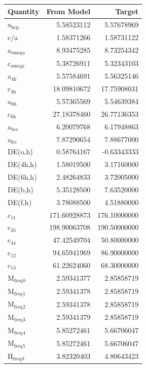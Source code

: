\documentclass[11pt]{article}
\begin{document}
\begin{center}
\begin{tabular}{lrr}
Quantity & From Model & Target\\
\hline
a\(_{\text{hcp}}\) & 5.58523112 & 5.57678969\\
c/a & 1.58371266 & 1.58731122\\
a\(_{\text{omega}}\) & 8.93475285 & 8.73254342\\
c\(_{\text{omega}}\) & 5.38726911 & 5.32343103\\
a\(_{\text{4h}}\) & 5.57584691 & 5.56325146\\
c\(_{\text{4h}}\) & 18.09810672 & 17.75908031\\
a\(_{\text{6h}}\) & 5.57365569 & 5.54639384\\
c\(_{\text{6h}}\) & 27.18378460 & 26.77136353\\
a\(_{\text{bcc}}\) & 6.20079768 & 6.17948863\\
a\(_{\text{fcc}}\) & 7.87290654 & 7.88677000\\
DE(o,h) & 0.58764167 & -0.63343333\\
DE(4h,h) & 1.58019500 & 3.17160000\\
DE(6h,h) & 2.48264833 & 3.72005000\\
DE(b,h) & 5.35128500 & 7.63520000\\
DE(f,h) & 3.78088500 & 4.51880000\\
c\(_{\text{11}}\) & 171.60928873 & 176.10000000\\
c\(_{\text{33}}\) & 198.90063708 & 190.50000000\\
c\(_{\text{44}}\) & 47.42549704 & 50.80000000\\
c\(_{\text{12}}\) & 94.65941969 & 86.90000000\\
c\(_{\text{13}}\) & 61.22624060 & 68.30000000\\
M\(_{\text{freq}}\)\(_{\text{0}}\) & 2.59341377 & 2.85858719\\
M\(_{\text{freq}}\)\(_{\text{1}}\) & 2.59341378 & 2.85858719\\
M\(_{\text{freq}}\)\(_{\text{2}}\) & 2.59341378 & 2.85858719\\
M\(_{\text{freq}}\)\(_{\text{3}}\) & 2.59341379 & 2.85858719\\
M\(_{\text{freq}}\)\(_{\text{4}}\) & 5.85272461 & 5.66706047\\
M\(_{\text{freq}}\)\(_{\text{5}}\) & 5.85272461 & 5.66706047\\
H\(_{\text{freq}}\)\(_{\text{0}}\) & 3.82320403 & 4.80643423\\

\end{tabular}
\end{center}
\end{document}
